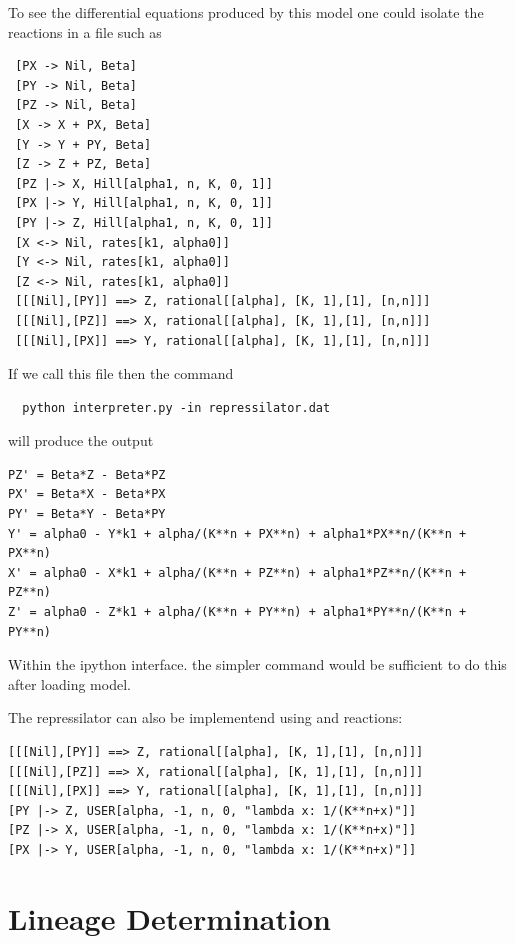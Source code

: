 To see the differential equations produced by this model one could isolate the reactions in a file such as 
\begin{lstlisting}
 [PX -> Nil, Beta]
 [PY -> Nil, Beta]
 [PZ -> Nil, Beta]
 [X -> X + PX, Beta]
 [Y -> Y + PY, Beta]
 [Z -> Z + PZ, Beta]
 [PZ |-> X, Hill[alpha1, n, K, 0, 1]]
 [PX |-> Y, Hill[alpha1, n, K, 0, 1]]
 [PY |-> Z, Hill[alpha1, n, K, 0, 1]]
 [X <-> Nil, rates[k1, alpha0]]
 [Y <-> Nil, rates[k1, alpha0]]
 [Z <-> Nil, rates[k1, alpha0]]
 [[[Nil],[PY]] ==> Z, rational[[alpha], [K, 1],[1], [n,n]]]
 [[[Nil],[PZ]] ==> X, rational[[alpha], [K, 1],[1], [n,n]]]
 [[[Nil],[PX]] ==> Y, rational[[alpha], [K, 1],[1], [n,n]]]
\end{lstlisting}
If we call this file  then the command
\begin{lstlisting}
  python interpreter.py -in repressilator.dat
\end{lstlisting}
will produce the output
\begin{lstlisting}
PZ' = Beta*Z - Beta*PZ
PX' = Beta*X - Beta*PX
PY' = Beta*Y - Beta*PY
Y' = alpha0 - Y*k1 + alpha/(K**n + PX**n) + alpha1*PX**n/(K**n + PX**n)
X' = alpha0 - X*k1 + alpha/(K**n + PZ**n) + alpha1*PZ**n/(K**n + PZ**n)
Z' = alpha0 - Z*k1 + alpha/(K**n + PY**n) + alpha1*PY**n/(K**n + PY**n)
\end{lstlisting}
Within the ipython interface. the simpler command  would
be sufficient to do this after loading model.

The repressilator can also be implementend using  and  reactions:

\begin{lstlisting}
[[[Nil],[PY]] ==> Z, rational[[alpha], [K, 1],[1], [n,n]]]
[[[Nil],[PZ]] ==> X, rational[[alpha], [K, 1],[1], [n,n]]]
[[[Nil],[PX]] ==> Y, rational[[alpha], [K, 1],[1], [n,n]]]
[PY |-> Z, USER[alpha, -1, n, 0, "lambda x: 1/(K**n+x)"]]
[PZ |-> X, USER[alpha, -1, n, 0, "lambda x: 1/(K**n+x)"]]
[PX |-> Y, USER[alpha, -1, n, 0, "lambda x: 1/(K**n+x)"]]
\end{lstlisting}

\clearpage
\section{Lineage Determination}


